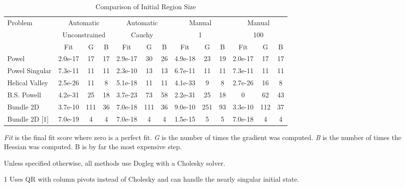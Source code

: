 \begin{table}[h]
\centering
\begin{threeparttable}
\caption{\label{results:initial_region}Comparison of Initial Region Size}
\begin{tabular}{|l||c|c|c||c|c|c||c|c|c||c|c|c|}
\hline
Problem        & \multicolumn{3}{c||}{Automatic} & \multicolumn{3}{c||}{Automatic} & \multicolumn{3}{c||}{Manual} & \multicolumn{3}{c|}{Manual}\\
               & \multicolumn{3}{c||}{Unconstrained} & \multicolumn{3}{c||}{Cauchy} & \multicolumn{3}{c||}{1} & \multicolumn{3}{c|}{100} \\
\hline
               & Fit     & G  & B  & Fit     & G  & B   & Fit     & G  & B  & Fit     & G  & B\\
\hline
Powel          & 2.0e-17 & 17 & 17 & 2.9e-17 & 30 & 26  & 4.9e-18 & 23 & 19 & 2.0e-17 & 17 & 17 \\
Powel Singular & 7.3e-11 & 11 & 11 & 2.3e-10 & 13 & 13  & 6.7e-11 & 11 & 11 & 7.3e-11 & 11 & 11 \\
Helical Valley & 2.5e-26 & 11 & 8  & 5.1e-18 & 11 & 11  & 4.1e-33 & 9  & 8  & 2.7e-26 & 16 & 8\\
B.S. Powell    & 4.2e-31 & 25 & 18 & 3.7e-23 & 73 & 58  & 2.2e-31 & 25 & 18 & 0       & 62 & 43 \\
Bundle 2D      & 3.7e-10 & 111& 36 & 7.0e-18 & 111& 36  & 9.0e-10 & 251& 93 & 3.3e-10 & 112 & 37 \\
Bundle 2D [1]  & 7.0e-19 & 4  & 4  & 7.0e-18 & 4  & 4   & 1.5e-15 & 5  & 5  & 7.0e-18 & 4 & 4 \\ \hline
\end{tabular}
\begin{tablenotes}
\small
\item \emph{Fit} is the final fit score where zero is a perfect fit. \emph{G} is the number of times the gradient was computed. \emph{B} is the number of times the Hessian was computed. B is by far the most expensive step.
\item Unless specified otherwise, all methods use Dogleg with a Cholesky solver.
\item [1] Uses QR with column pivots instead of Cholesky and can handle the nearly singular initial state.
\end{tablenotes}
\end{threeparttable}
\end{table}